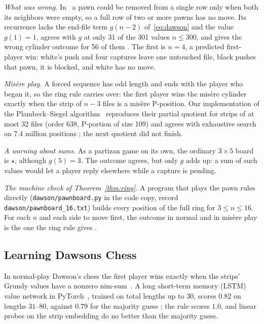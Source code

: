 \emph{What was wrong.} In~\cite{Study2025} a pawn could be removed from a single row only when
both its neighbors were empty, so a full row of two or more pawns has no move. Its recurrence lacks the
end-file term $g(n-2)$ of~\eqref{eq:dawson} and the value $g(1)=1$, agrees with $g$ at only 31 of the 301 values
$n\le300$, and gives the wrong cylinder outcome for 56 of them . The first is $n=4$, a predicted
first-player win: white's push and four captures leave one untouched file, black pushes that pawn, it is
blocked, and white has no move.

\emph{Mis\`ere play.} A forced sequence has odd length and ends with the player who began it, so the
ring rule carries over: the first player wins the mis\`ere cylinder exactly when the strip of $n-3$ files is
a mis\`ere P-position. Our implementation of the Plambeck--Siegel algorithm~\cite{PlambeckSiegel2008}
reproduces their partial quotient for strips of at most 32 files (order 638, P-portion of size 109) and agrees
with exhaustive search on 7.4 million positions ; the next quotient did not finish.

\emph{A warning about sums.} As a partizan game on its own, the ordinary $3\times5$ board is $\star$,
although $g(5)=3$. The outcome agrees, but only $g$ adds up: a sum of such values would let a player reply
elsewhere while a capture is pending.

\emph{The machine check of Theorem~\ref{thm:ring}.} A program that plays the pawn rules directly (\texttt{dawson/pawnboard.py} in the code copy, record \texttt{dawson/pawnboard\_16.txt}) builds every position of the full ring for $3\le n\le16$. For each $n$ and each side to move first, the outcome in normal and in mis\`ere play is the one the ring rule gives .
\subsection{Learning Dawson\textquotesingle{}s Chess}
In normal-play Dawson's chess the first player wins exactly when the strips' Grundy values have a nonzero
nim-sum~\cite{GuySmith1956,WinningWays}. A long short-term memory (LSTM) value network in PyTorch~\cite{PyTorch}, trained on total lengths up to
$30$, scores $0.82$ on lengths $31$--$80$, against $0.79$ for the majority guess ; the rule scores $1.0$,
and linear probes on the strip embedding do no better than the majority guess.
